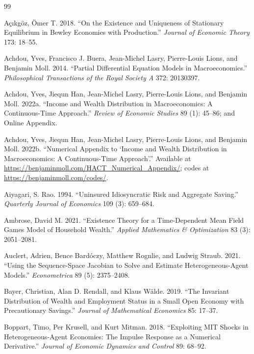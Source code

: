 \documentclass[11pt]{article}
\theoremstyle{definition}
\theoremstyle{remark}
\begin{document}
\begin{thebibliography}{99}

A\c{c}{\i}kg\"oz, \"Omer T. 2018. ``On the Existence and Uniqueness
of Stationary Equilibrium in Bewley Economies with Production.''
\emph{Journal of Economic Theory} 173: 18--55.

Achdou, Yves, Francisco J. Buera, Jean-Michel Lasry, Pierre-Louis
Lions, and Benjamin Moll. 2014. ``Partial Differential Equation
Models in Macroeconomics.'' \emph{Philosophical Transactions of the
Royal Society A} 372: 20130397.

Achdou, Yves, Jiequn Han, Jean-Michel Lasry, Pierre-Louis Lions, and
Benjamin Moll. 2022a. ``Income and Wealth Distribution in
Macroeconomics: A Continuous-Time Approach.'' \emph{Review of
Economic Studies} 89 (1): 45--86; and Online Appendix.

Achdou, Yves, Jiequn Han, Jean-Michel Lasry, Pierre-Louis Lions, and
Benjamin Moll. 2022b. ``Numerical Appendix to `Income and Wealth
Distribution in Macroeconomics: A Continuous-Time Approach'.''
Available at \url{https://benjaminmoll.com/HACT_Numerical_Appendix/};
codes at \url{https://benjaminmoll.com/codes/}.

Aiyagari, S. Rao. 1994. ``Uninsured Idiosyncratic Risk and Aggregate
Saving.'' \emph{Quarterly Journal of Economics} 109 (3): 659--684.

Ambrose, David M. 2021. ``Existence Theory for a Time-Dependent Mean
Field Games Model of Household Wealth.'' \emph{Applied Mathematics \&
Optimization} 83 (3): 2051--2081.

Auclert, Adrien, Bence Bard\'oczy, Matthew Rognlie, and Ludwig
Straub. 2021. ``Using the Sequence-Space Jacobian to Solve and
Estimate Heterogeneous-Agent Models.'' \emph{Econometrica} 89 (5):
2375--2408.

Bayer, Christian, Alan D. Rendall, and Klaus W\"alde. 2019. ``The
Invariant Distribution of Wealth and Employment Status in a Small
Open Economy with Precautionary Savings.'' \emph{Journal of
Mathematical Economics} 85: 17--37.

Boppart, Timo, Per Krusell, and Kurt Mitman. 2018. ``Exploiting MIT
Shocks in Heterogeneous-Agent Economies: The Impulse Response as a
Numerical Derivative.'' \emph{Journal of Economic Dynamics and
Control} 89: 68--92.


\end{thebibliography}
\end{document}
